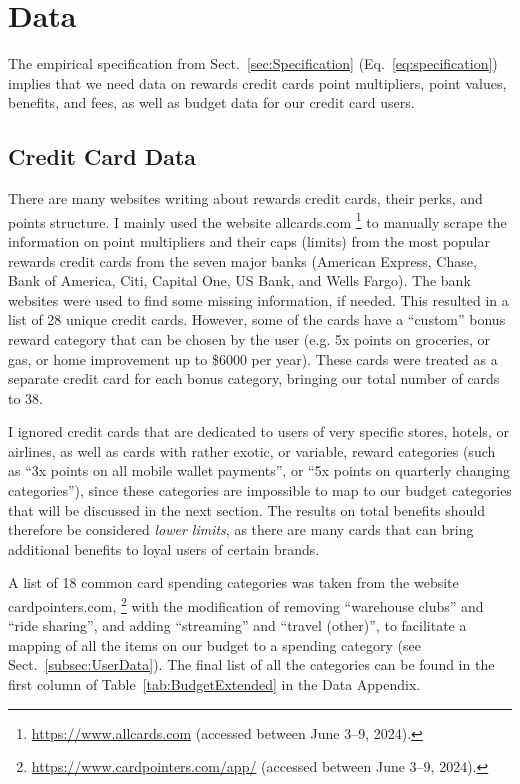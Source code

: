 \section{Data} \label{sec:Data}

The empirical specification from Sect.~\ref{sec:Specification} (Eq.~\ref{eq:specification}) implies that we need data on rewards credit cards point multipliers, point values, benefits, and fees, as well as budget data for our credit card users.

\subsection{Credit Card Data} \label{subsec:CreditCardData}

There are many websites writing about rewards credit cards, their perks, and points structure. 
I mainly used the website allcards.com%
\footnote{\url{https://www.allcards.com} (accessed between June 3--9, 2024).}
to manually scrape the information on point multipliers and their caps (limits) from the most popular rewards credit cards from the seven major banks (American Express, Chase, Bank of America, Citi, Capital One, US Bank, and Wells Fargo). 
The bank websites were used to find some missing information, if needed. 
This resulted in a list of 28 unique credit cards. 
However, some of the cards have a ``custom'' bonus reward category that can be chosen by the user (e.g. 5x points on groceries, or gas, or home improvement up to \$6000 per year). 
These cards were treated as a separate credit card for each bonus category, bringing our total number of cards to 38. 

I ignored credit cards that are dedicated to users of very specific stores, hotels, or airlines, as well as cards with rather exotic, or variable, reward categories (such as ``3x points on all mobile wallet payments'', or ``5x points on quarterly changing categories''), since these categories are impossible to map to our budget categories that will be discussed in the next section. 
The results on total benefits should therefore be considered \emph{lower limits}, as there are many cards that can bring additional benefits to loyal users of certain brands.
 
A list of 18 common card spending categories was taken from the website cardpointers.com,%
\footnote{\url{https://www.cardpointers.com/app/} (accessed between June 3--9, 2024).}
with the modification of removing ``warehouse clubs'' and ``ride sharing'', and adding ``streaming'' and ``travel (other)'', to facilitate a mapping of all the items on our budget to a spending category (see Sect.~\ref{subsec:UserData}). The final list of all the categories can be found in the first column of Table~\ref{tab:BudgetExtended} in the Data Appendix.

